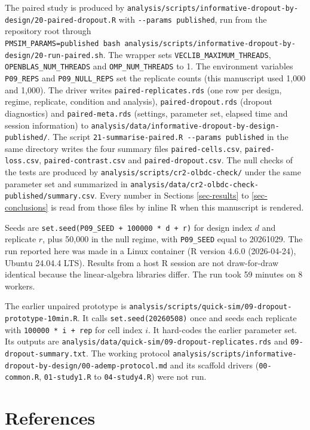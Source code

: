 \documentclass[
  11pt,
]{article}
\begin{document}
The paired study is produced by
\texttt{analysis/scripts/informative-dropout-by-design/20-paired-dropout.R}
with \texttt{-\/-params\ published}, run from the repository root through
\texttt{PMSIM\_PARAMS=published\ bash\ analysis/scripts/informative-dropout-by-design/20-run-paired.sh}.
The wrapper sets \texttt{VECLIB\_MAXIMUM\_THREADS}, \texttt{OPENBLAS\_NUM\_THREADS} and
\texttt{OMP\_NUM\_THREADS} to 1. The environment variables \texttt{P09\_REPS} and
\texttt{P09\_NULL\_REPS} set the replicate counts (this manuscript used
1,000 and 1,000). The driver writes
\texttt{paired-replicates.rds} (one row per design, regime, replicate,
condition and analysis), \texttt{paired-dropout.rds} (dropout diagnostics)
and \texttt{paired-meta.rds} (settings, parameter set, elapsed time and
session information) to
\texttt{analysis/data/informative-dropout-by-design-published/}. The script
\texttt{21-summarise-paired.R\ -\/-params\ published} in the same directory
writes the four summary files \texttt{paired-cells.csv}, \texttt{paired-loss.csv},
\texttt{paired-contrast.csv} and \texttt{paired-dropout.csv}. The null checks of the
tests are produced by \texttt{analysis/scripts/cr2-olbdc-check/} under the
same parameter set and summarized in
\texttt{analysis/data/cr2-olbdc-check-published/summary.csv}. Every number in
Sections \ref{sec-results} to \ref{sec-conclusions} is read from
those files by inline R when this manuscript is rendered.

Seeds are \texttt{set.seed(P09\_SEED\ +\ 100000\ *\ d\ +\ r)} for design index \(d\)
and replicate \(r\), plus 50,000 in the null regime, with \texttt{P09\_SEED}
equal to 20261029. The run
reported here was made in a Linux container
(R version 4.6.0 (2026-04-24),
Ubuntu 24.04.4 LTS). Results from a host R session are not
draw-for-draw identical because the linear-algebra libraries differ.
The run took 59 minutes on
8 workers.

The earlier unpaired prototype is
\texttt{analysis/scripts/quick-sim/09-dropout-prototype-10min.R}. It calls
\texttt{set.seed(20260508)} once and seeds each replicate with
\texttt{100000\ *\ i\ +\ rep} for cell index \(i\). It hard-codes the earlier
parameter set. Its outputs are
\texttt{analysis/data/quick-sim/09-dropout-replicates.rds} and
\texttt{09-dropout-summary.txt}. The working protocol
\texttt{analysis/scripts/informative-dropout-by-design/00-ademp-protocol.md}
and its scaffold drivers (\texttt{00-common.R}, \texttt{01-study1.R} to
\texttt{04-study4.R}) were not run.

\section*{References}\label{references}
\end{document}

